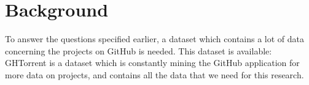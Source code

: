 \section{Background}
To answer the questions specified earlier, a dataset which contains a lot of data concerning the projects on GitHub is needed. 
This dataset is available: GHTorrent \cite{gousios-2013} is a dataset which is constantly mining the GitHub application for more data on projects, and contains all the data that we need for this research.

